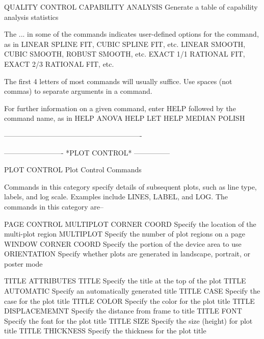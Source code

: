 QUALITY CONTROL
   CAPABILITY ANALYSIS     Generate a table of capability analysis
                           statistics
 
The ... in some of the commands indicates user-defined options for the
command, as in
   LINEAR SPLINE FIT, CUBIC SPLINE FIT, etc.
   LINEAR SMOOTH, CUBIC SMOOTH, ROBUST SMOOTH, etc.
   EXACT 1/1 RATIONAL FIT, EXACT 2/3 RATIONAL FIT, etc.
 
The first 4 letters of most commands will usually suffice.  Use spaces
(not commas) to separate arguments in a command.
 
For further information on a given command, enter HELP   followed by
the command name, as in
   HELP ANOVA
   HELP LET
   HELP MEDIAN POLISH
 
----------------------------------------------------------
 
 
 
 
 
 
 
 
 
 
 
 
 
 
 
 
 
 
 
 
 
 
 
 
 
 
 
 
 
 
 
 
 
-------------------------  *PLOT CONTROL*  ---------------
 
PLOT CONTROL
Plot Control Commands
 
Commands in this category specify details of subsequent plots, such as
line type, labels, and log scale.  Examples include LINES, LABEL, and
LOG.  The commands in this category are--
 
PAGE CONTROL
   MULTIPLOT CORNER COORD     Specify the location of the multi-plot
                              region
   MULTIPLOT                  Specify the number of plot regions on a
                              page
   WINDOW CORNER COORD        Specify the portion of the device area
                              to use
   ORIENTATION                Specify whether plots are generated in
                              landscape, portrait, or poster mode
 
TITLE ATTRIBUTES
   TITLE                      Specify the title at the top of the plot
   TITLE AUTOMATIC            Specify an automatically generated title
   TITLE CASE                 Specify the case for the plot title
   TITLE COLOR                Specify the color for the plot title
   TITLE DISPLACEMEMNT        Specify the distance from frame to title
   TITLE FONT                 Specify the font for the plot title
   TITLE SIZE                 Specify the size (height) for plot title
   TITLE THICKNESS            Specify the thickness for the plot title
 
